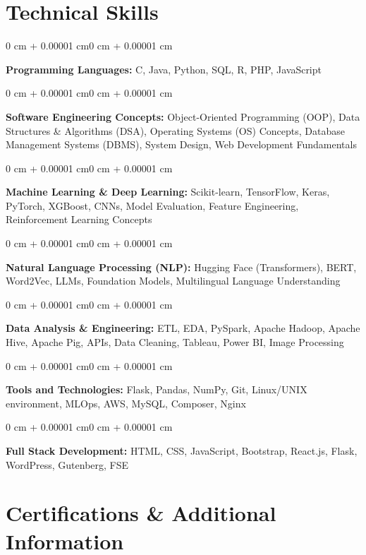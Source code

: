 \documentclass[10pt, letterpaper]{article}
\newenvironment{onecolentry}{
\begin{adjustwidth}{0 cm + 0.00001 cm}{0 cm + 0.00001 cm}
}{
\end{adjustwidth}
}
\begin{document}
\section{Technical Skills}
\begin{onecolentry}
\textbf{Programming Languages:} C, Java, Python, SQL, R, PHP, JavaScript
\end{onecolentry}
\vspace{0.1 cm}
\begin{onecolentry}
\textbf{Software Engineering Concepts:} Object-Oriented Programming (OOP), Data Structures \& Algorithms (DSA), Operating Systems (OS) Concepts, Database Management Systems (DBMS), System Design, Web Development Fundamentals
\end{onecolentry}
\vspace{0.1 cm}
\begin{onecolentry}
\textbf{Machine Learning \& Deep Learning:} Scikit-learn, TensorFlow, Keras, PyTorch, XGBoost, CNNs, Model Evaluation, Feature Engineering, Reinforcement Learning Concepts
\end{onecolentry}
\vspace{0.1 cm}
\begin{onecolentry}
\textbf{Natural Language Processing (NLP):} Hugging Face (Transformers), BERT, Word2Vec, LLMs, Foundation Models, Multilingual Language Understanding
\end{onecolentry}
\vspace{0.1 cm}
\begin{onecolentry}
\textbf{Data Analysis \& Engineering:} ETL, EDA, PySpark, Apache Hadoop, Apache Hive, Apache Pig, APIs, Data Cleaning, Tableau, Power BI, Image Processing
\end{onecolentry}
\vspace{0.1 cm}
\begin{onecolentry}
\textbf{Tools and Technologies:} Flask, Pandas, NumPy, Git, Linux/UNIX environment, MLOps, AWS, MySQL, Composer, Nginx
\end{onecolentry}
\vspace{0.1 cm}
\begin{onecolentry}
\textbf{Full Stack Development:} HTML, CSS, JavaScript, Bootstrap, React.js, Flask, WordPress, Gutenberg, FSE
\end{onecolentry}

\section{Certifications \& Additional Information}
\end{document}
